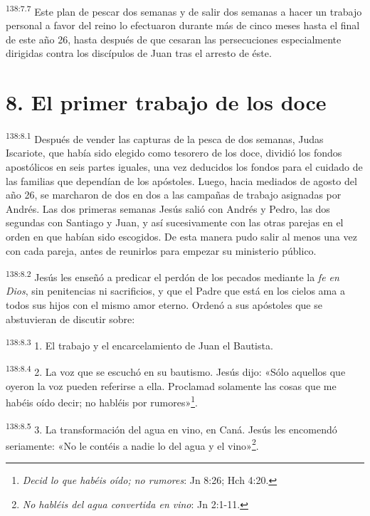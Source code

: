 \par 
\textsuperscript{138:7.7} Este plan de pescar dos semanas y de salir dos semanas a hacer un trabajo personal a favor del reino lo efectuaron durante más de cinco meses hasta el final de este año 26, hasta después de que cesaran las persecuciones especialmente dirigidas contra los discípulos de Juan tras el arresto de éste.

\section*{8. El primer trabajo de los doce}
\par 
\textsuperscript{138:8.1} Después de vender las capturas de la pesca de dos semanas, Judas Iscariote, que había sido elegido como tesorero de los doce, dividió los fondos apostólicos en seis partes iguales, una vez deducidos los fondos para el cuidado de las familias que dependían de los apóstoles. Luego, hacia mediados de agosto del año 26, se marcharon de dos en dos a las campañas de trabajo asignadas por Andrés. Las dos primeras semanas Jesús salió con Andrés y Pedro, las dos segundas con Santiago y Juan, y así sucesivamente con las otras parejas en el orden en que habían sido escogidos. De esta manera pudo salir al menos una vez con cada pareja, antes de reunirlos para empezar su ministerio público.

\par 
\textsuperscript{138:8.2} Jesús les enseñó a predicar el perdón de los pecados mediante la \textit{fe en Dios}, sin penitencias ni sacrificios, y que el Padre que está en los cielos ama a todos sus hijos con el mismo amor eterno. Ordenó a sus apóstoles que se abstuvieran de discutir sobre:

\par 
\textsuperscript{138:8.3} 1. El trabajo y el encarcelamiento de Juan el Bautista.

\par 
\textsuperscript{138:8.4} 2. La voz que se escuchó en su bautismo. Jesús dijo: «Sólo aquellos que oyeron la voz pueden referirse a ella. Proclamad solamente las cosas que me habéis oído decir; no habléis por rumores»\footnote{\textit{Decid lo que habéis oído; no rumores}: Jn 8:26; Hch 4:20.}.

\par 
\textsuperscript{138:8.5} 3. La transformación del agua en vino, en Caná. Jesús les encomendó seriamente: «No le contéis a nadie lo del agua y el vino»\footnote{\textit{No habléis del agua convertida en vino}: Jn 2:1-11.}.

